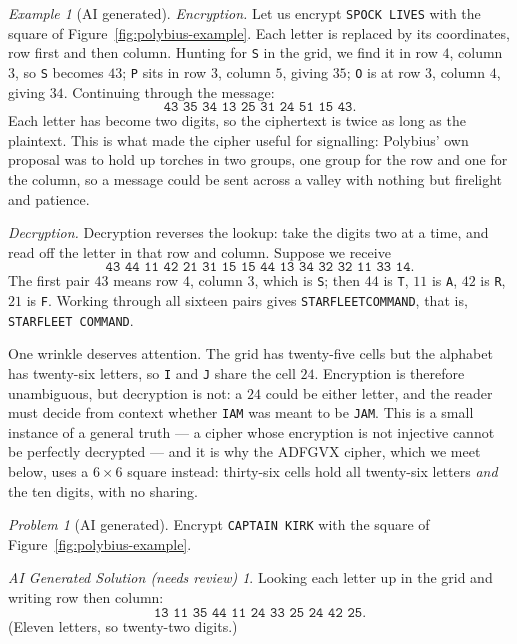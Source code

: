 \documentclass{article}
\theoremstyle{plain}
\theoremstyle{definition}
\theoremstyle{remark}
\newtheorem{example}[theorem]{Example}
\newtheorem{problem}[theorem]{Problem}
\newtheorem*{aisolution}{AI Generated Solution (needs review)}
\numberwithin{theorem}{section}
\begin{document}
\begin{example}[AI generated]
\emph{Encryption.}  Let us encrypt \texttt{SPOCK LIVES} with the square of Figure~\ref{fig:polybius-example}.  Each letter is replaced by its coordinates, row first and then column.  Hunting for \texttt{S} in the grid, we find it in row $4$, column $3$, so \texttt{S} becomes $43$; \texttt{P} sits in row $3$, column $5$, giving $35$; \texttt{O} is at row $3$, column $4$, giving $34$.  Continuing through the message:
\[
	\texttt{43 35 34 13 25 31 24 51 15 43}.
\]
Each letter has become two digits, so the ciphertext is twice as long as the plaintext.  This is what made the cipher useful for signalling:  Polybius' own proposal was to hold up torches in two groups, one group for the row and one for the column, so a message could be sent across a valley with nothing but firelight and patience.

\emph{Decryption.}  Decryption reverses the lookup:  take the digits two at a time, and read off the letter in that row and column.  Suppose we receive
\[
	\texttt{43 44 11 42 21 31 15 15 44 13 34 32 32 11 33 14}.
\]
The first pair $43$ means row $4$, column $3$, which is \texttt{S}; then $44$ is \texttt{T}, $11$ is \texttt{A}, $42$ is \texttt{R}, $21$ is \texttt{F}.  Working through all sixteen pairs gives \texttt{STARFLEETCOMMAND}, that is, \texttt{STARFLEET COMMAND}.

One wrinkle deserves attention.  The grid has twenty-five cells but the alphabet has twenty-six letters, so \texttt{I} and \texttt{J} share the cell $24$.  Encryption is therefore unambiguous, but decryption is not:  a $24$ could be either letter, and the reader must decide from context whether \texttt{IAM} was meant to be \texttt{JAM}.  This is a small instance of a general truth --- a cipher whose encryption is not injective cannot be perfectly decrypted --- and it is why the ADFGVX cipher, which we meet below, uses a $6 \times 6$ square instead:  thirty-six cells hold all twenty-six letters \emph{and} the ten digits, with no sharing.
\end{example}

\begin{problem}[AI generated]
Encrypt \texttt{CAPTAIN KIRK} with the square of Figure~\ref{fig:polybius-example}.
\end{problem}
\begin{aisolution}
Looking each letter up in the grid and writing row then column:
\[
	\texttt{13 11 35 44 11 24 33 25 24 42 25}.
\]
(Eleven letters, so twenty-two digits.)
\end{aisolution}
\end{document}
